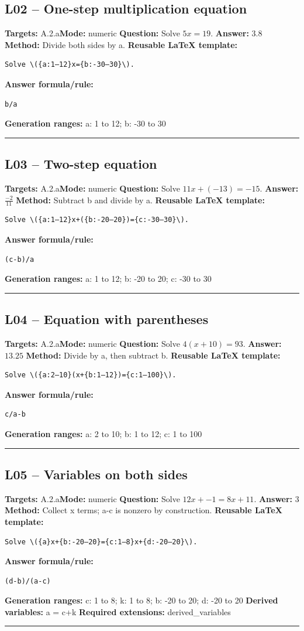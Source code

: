 \documentclass[11pt]{article}
\begin{document}
\subsection{L02 -- One-step multiplication equation}
\textbf{Targets:} A.2.a\quad\textbf{Mode:} numeric
\textbf{Question:} Solve \(5x=19\).
\textbf{Answer:} \(3.8\)
\textbf{Method:} Divide both sides by a.
\textbf{Reusable LaTeX template:}
\begin{verbatim}
Solve \({a:1–12}x={b:-30–30}\).
\end{verbatim}
\textbf{Answer formula/rule:}
\begin{verbatim}
b/a
\end{verbatim}
\textbf{Generation ranges:} a: 1 to 12; b: -30 to 30
\medskip\hrule\medskip
\subsection{L03 -- Two-step equation}
\textbf{Targets:} A.2.a\quad\textbf{Mode:} numeric
\textbf{Question:} Solve \(11x+(-13)=-15\).
\textbf{Answer:} \(\frac{-2}{11}\)
\textbf{Method:} Subtract b and divide by a.
\textbf{Reusable LaTeX template:}
\begin{verbatim}
Solve \({a:1–12}x+({b:-20–20})={c:-30–30}\).
\end{verbatim}
\textbf{Answer formula/rule:}
\begin{verbatim}
(c-b)/a
\end{verbatim}
\textbf{Generation ranges:} a: 1 to 12; b: -20 to 20; c: -30 to 30
\medskip\hrule\medskip
\subsection{L04 -- Equation with parentheses}
\textbf{Targets:} A.2.a\quad\textbf{Mode:} numeric
\textbf{Question:} Solve \(4(x+10)=93\).
\textbf{Answer:} \(13.25\)
\textbf{Method:} Divide by a, then subtract b.
\textbf{Reusable LaTeX template:}
\begin{verbatim}
Solve \({a:2–10}(x+{b:1–12})={c:1–100}\).
\end{verbatim}
\textbf{Answer formula/rule:}
\begin{verbatim}
c/a-b
\end{verbatim}
\textbf{Generation ranges:} a: 2 to 10; b: 1 to 12; c: 1 to 100
\medskip\hrule\medskip
\subsection{L05 -- Variables on both sides}
\textbf{Targets:} A.2.a\quad\textbf{Mode:} numeric
\textbf{Question:} Solve \(12x+-1=8x+11\).
\textbf{Answer:} \(3\)
\textbf{Method:} Collect x terms; a-c is nonzero by construction.
\textbf{Reusable LaTeX template:}
\begin{verbatim}
Solve \({a}x+{b:-20–20}={c:1–8}x+{d:-20–20}\).
\end{verbatim}
\textbf{Answer formula/rule:}
\begin{verbatim}
(d-b)/(a-c)
\end{verbatim}
\textbf{Generation ranges:} c: 1 to 8; k: 1 to 8; b: -20 to 20; d: -20 to 20
\textbf{Derived variables:} a = c+k
\textbf{Required extensions:} derived\_variables
\medskip\hrule\medskip
\end{document}
